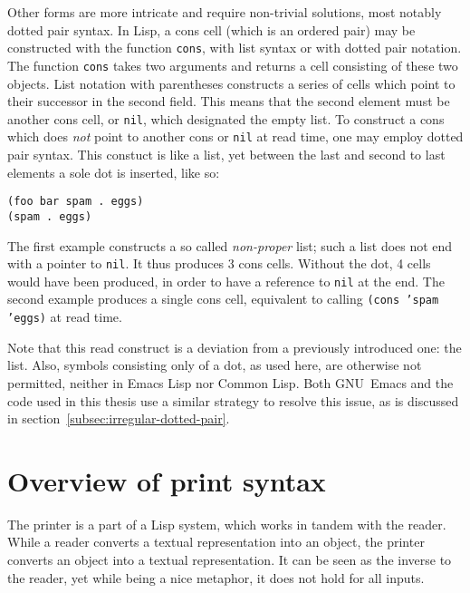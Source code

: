 \documentclass[a4paper,10pt,twoside]{report}
\newcommand{\el}{Emacs Lisp}
\newcommand{\cl}{Common Lisp}
\newcommand{\sym}[1]{\texttt{#1}}
\newcommand{\fun}[1]{\texttt{#1}}
\newcommand{\emacs}{GNU~Emacs}
\newcommand{\nil}{\sym{nil}}
\begin{document}
Other forms are more intricate and require non-trivial solutions, most notably
dotted pair syntax.  In Lisp, a cons cell (which is an ordered pair) may be
constructed with the function \fun{cons}, with list syntax or with dotted pair
notation.  The function \fun{cons} takes two arguments and returns a cell
consisting of these two objects.  List notation with parentheses constructs a
series of cells which point to their successor in the second field.  This means
that the second element must be another cons cell, or \nil{}, which designated the
empty list.  To construct a cons which does \emph{not} point to another cons or
\nil{} at read time, one may employ dotted pair syntax.  This constuct is like a
list, yet between the last and second to last elements a sole dot is inserted,
like so:

\begin{lstlisting}[style=lispinline]
(foo bar spam . eggs)
(spam . eggs)
\end{lstlisting}

The first example constructs a so called \emph{non-proper} list; such a list
does not end with a pointer to \nil{}.  It thus produces 3 cons cells.  Without
the dot, 4 cells would have been produced, in order to have a reference to
\nil{} at the end.  The second example produces a single cons cell, equivalent
to calling \texttt{(cons 'spam 'eggs)} at read time.

Note that this read construct is a deviation from a previously introduced one:
the list.  Also, symbols consisting only of a dot, as used here, are otherwise
not permitted, neither in \el{} nor \cl{}.  Both \emacs{} and the code used in
this thesis use a similar strategy to resolve this issue, as is discussed in
section~\ref{subsec:irregular-dotted-pair}.


\section{Overview of print syntax}
\label{subsec:print-syntax}

The printer is a part of a Lisp system, which works in tandem with the reader.
While a reader converts a textual representation into an object, the printer
converts an object into a textual representation.  It can be seen as the inverse
to the reader, yet while being a nice metaphor, it does not hold for all inputs.
\end{document}
